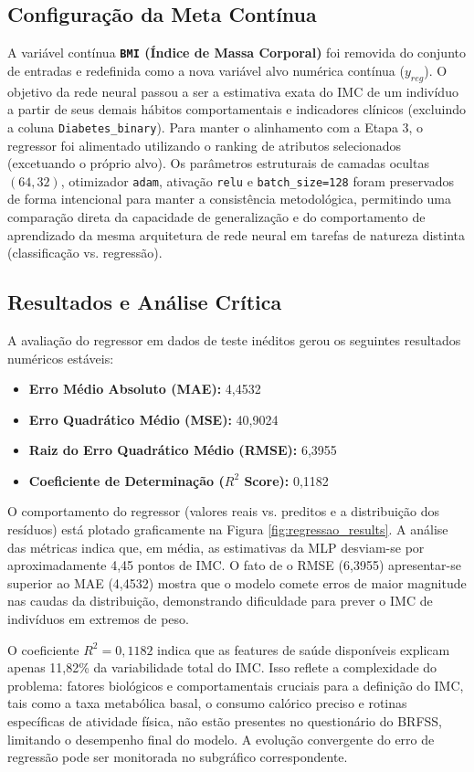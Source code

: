 \documentclass[12pt,a4paper]{article}
\begin{document}
\subsection{Configuração da Meta Contínua}
A variável contínua \textbf{\texttt{BMI} (Índice de Massa Corporal)} foi removida do conjunto de entradas e redefinida como a nova variável alvo numérica contínua ($y_{reg}$). O objetivo da rede neural passou a ser a estimativa exata do IMC de um indivíduo a partir de seus demais hábitos comportamentais e indicadores clínicos (excluindo a coluna \texttt{Diabetes\_binary}). Para manter o alinhamento com a Etapa 3, o regressor foi alimentado utilizando o ranking de atributos selecionados (excetuando o próprio alvo). Os parâmetros estruturais de camadas ocultas $(64, 32)$, otimizador \texttt{adam}, ativação \texttt{relu} e \texttt{batch\_size=128} foram preservados de forma intencional para manter a consistência metodológica, permitindo uma comparação direta da capacidade de generalização e do comportamento de aprendizado da mesma arquitetura de rede neural em tarefas de natureza distinta (classificação vs. regressão).

\subsection{Resultados e Análise Crítica}
A avaliação do regressor em dados de teste inéditos gerou os seguintes resultados numéricos estáveis:
\begin{itemize}
    \item \textbf{Erro Médio Absoluto (MAE):} 4,4532
    \item \textbf{Erro Quadrático Médio (MSE):} 40,9024
    \item \textbf{Raiz do Erro Quadrático Médio (RMSE):} 6,3955
    \item \textbf{Coeficiente de Determinação ($R^2$ Score):} 0,1182
\end{itemize}

O comportamento do regressor (valores reais vs. preditos e a distribuição dos resíduos) está plotado graficamente na Figura \ref{fig:regressao_results}. A análise das métricas indica que, em média, as estimativas da MLP desviam-se por aproximadamente 4,45 pontos de IMC. O fato de o RMSE (6,3955) apresentar-se superior ao MAE (4,4532) mostra que o modelo comete erros de maior magnitude nas caudas da distribuição, demonstrando dificuldade para prever o IMC de indivíduos em extremos de peso.

O coeficiente $R^2 = 0,1182$ indica que as features de saúde disponíveis explicam apenas 11,82\% da variabilidade total do IMC. Isso reflete a complexidade do problema: fatores biológicos e comportamentais cruciais para a definição do IMC, tais como a taxa metabólica basal, o consumo calórico preciso e rotinas específicas de atividade física, não estão presentes no questionário do BRFSS, limitando o desempenho final do modelo. A evolução convergente do erro de regressão pode ser monitorada no subgráfico correspondente.
\end{document}
